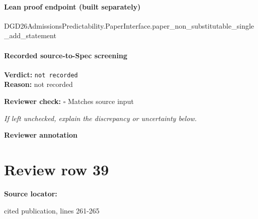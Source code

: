 \documentclass[10pt]{article}
\newcommand{\reviewerbox}{%
  \par\noindent\fbox{\parbox{0.96\linewidth}{\rule{0pt}{0.38in}}}\par
}
\newcommand{\reviewmatch}[1]{%
  \par\noindent\textbf{Reviewer check:} $\square$\; #1\par
  \noindent\emph{If left unchecked, explain the discrepancy or uncertainty below.}\par
}
\begin{document}
\paragraph{Lean proof endpoint (built separately)}\begin{ReviewVerbatim}
DGD26AdmissionsPredictability.PaperInterface.paper_non_substitutable_single_add_statement
\end{ReviewVerbatim}

\paragraph{Recorded source-to-Spec screening}
\textbf{Verdict:} \texttt{not recorded}
\\
\textbf{Reason:} not recorded
\reviewmatch{Matches source input}
\noindent\textbf{Reviewer annotation}\par
\reviewerbox
\clearpage
\hypertarget{source-claim-bc7eeffb236e6569}{}
\section*{Review row 39}
\textbf{Source locator:} {\footnotesize\raggedright cited publication, lines 261-\allowbreak{}265\par}
\end{document}

